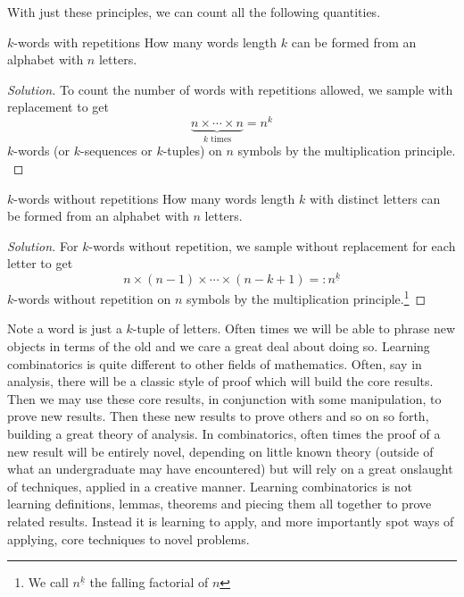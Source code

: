 \documentclass{article}
\begin{document}
With just these principles, we can count all the following quantities. 

\begin{problem}[]{$k$-words with repetitions}
    How many words length $k$ can be formed from an alphabet with $n$ letters.
\end{problem}

\begin{proof}[Solution]
    To count the number of words with repetitions allowed, we sample with replacement to get
    \[\underbrace{n \times \cdots \times n}_{k \text{ times}} = n^k\]
    $k$-words (or $k$-sequences or $k$-tuples) on $n$ symbols by the multiplication principle. \\
\end{proof}

\begin{problem}[]{$k$-words without repetitions}
    How many words length $k$ with distinct letters can be formed from an alphabet with $n$ letters. 
\end{problem}

\begin{proof}[Solution]
    For $k$-words without repetition, we sample without replacement for each letter to get
    \[n \times (n-1) \times \cdots \times (n-k+1) =: n^{\underline{k}}\]
    $k$-words without repetition on $n$ symbols by the multiplication principle.\footnote{
        We call $n^{\underline{k}}$ the falling factorial of $n$}
\end{proof}

Note a word is just a $k$-tuple of letters. Often times we will be able to phrase new objects in terms of the old 
and we care a great deal about doing so. Learning combinatorics is quite different to other fields of mathematics. 
Often, say in analysis, there will be a classic style of proof which will build the core results. Then we may 
use these core results, in conjunction with some manipulation, to prove new results. Then these new results 
to prove others and so on so forth, building a great theory of analysis. In combinatorics, often times the proof 
of a new result will be entirely novel, depending on little known theory (outside of what an undergraduate 
may have encountered) but will rely on a great onslaught of techniques, applied in a creative manner. Learning combinatorics
is not learning definitions, lemmas, theorems and piecing them all together to prove related results. Instead it is 
learning to apply, and more importantly spot ways of applying, core techniques to novel problems.  \\
\end{document}
